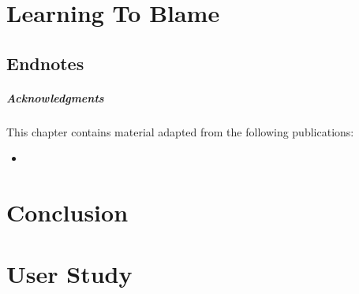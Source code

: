 \documentclass[11pt]{ucsddissertation}
\theoremstyle{plain}%
\theoremstyle{definition}
\begin{document}
%
%
%
%
%
%
%

\chapter{Learning To Blame}
\label{chp:nate}
\renewcommand\toolname{\tool{Nate}}
\renewcommand\lang{\ensuremath{\lambda^{ML}}}






%
\section*{Endnotes}
\paragraph{Acknowledgments}
This chapter contains material adapted from the following publications:
\begin{itemize}
\item {}
\end{itemize}

\chapter{Conclusion}


\appendix



\chapter{ User Study}
\label{sec:nanomaly:user-study-exams}
% 
\newpage
\end{document}

